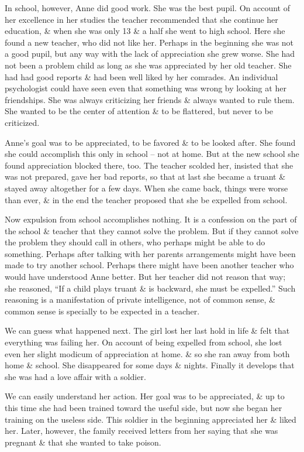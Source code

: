 \documentclass{article}
\begin{document}
In school, however, Anne did good work. She was the best pupil. On account of her excellence in her studies the teacher recommended that she continue her education, \& when she was only 13 \& a half she went to high school. Here she found a new teacher, who did not like her. Perhaps in the beginning she was not a good pupil, but any way with the lack of appreciation she grew worse. She had not been a problem child as long as she was appreciated by her old teacher. She had had good reports \& had been well liked by her comrades. An individual psychologist could have seen even that something was wrong by looking at her friendships. She was always criticizing her friends \& always wanted to rule them. She wanted to be the center of attention \& to be flattered, but never to be criticized.

Anne's goal was to be appreciated, to be favored \& to be looked after. She found she could accomplish this only in school -- not at home. But at the new school she found appreciation blocked there, too. The teacher scolded her, insisted that she was not prepared, gave her bad reports, so that at last she became a truant \& stayed away altogether for a few days. When she came back, things were worse than ever, \& in the end the teacher proposed that she be expelled from school.

Now expulsion from school accomplishes nothing. It is a confession on the part of the school \& teacher that they cannot solve the problem. But if they cannot solve the problem they should call in others, who perhaps might be able to do something. Perhaps after talking with her parents arrangements might have been made to try another school. Perhaps there might have been another teacher who would have understood Anne better. But her teacher did not reason that way; she reasoned, ``If a child plays truant \& is backward, she must be expelled.'' Such reasoning is a manifestation of private intelligence, not of common sense, \& common sense is specially to be expected in a teacher.

We can guess what happened next. The girl lost her last hold in life \& felt that everything was failing her. On account of being expelled from school, she lost even her slight modicum of appreciation at home. \& so she ran away from both home \& school. She disappeared for some days \& nights. Finally it develops that she was had a love affair with a soldier.

We can easily understand her action. Her goal was to be appreciated, \& up to this time she had been trained toward the useful side, but now she began her training on the useless side. This soldier in the beginning appreciated her \& liked her. Later, however, the family received letters from her saying that she was pregnant \& that she wanted to take poison.
\end{document}
